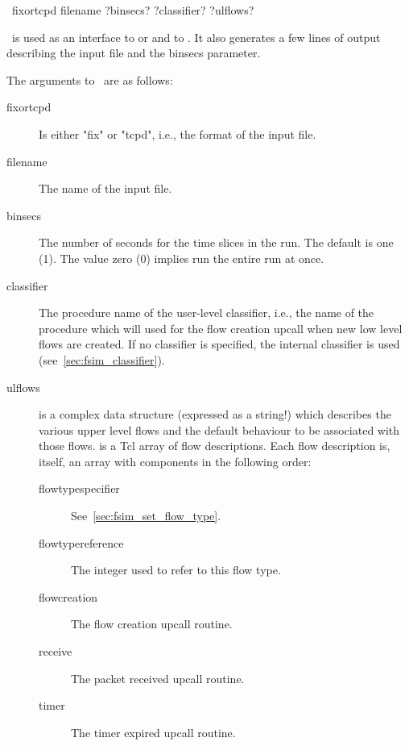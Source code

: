 \documentclass{article}
\begin{document}
\SYNOPSIS \cmdname\ fixortcpd filename ?binsecs? ?classifier? ?ulflows?

\cmdname\ is used as an interface to  or
 and to .  It also generates
a few lines of output describing the input file and the binsecs
parameter.

The arguments to \cmdname\ are as follows:
\begin{description}
\item[fixortcpd] Is either "fix" or "tcpd", i.e., the format of the
input file.
\item[filename] The name of the input file.
\item[binsecs] The number of seconds for the time slices in the run.
The default is one (1).  The value zero (0) implies run the entire run
at once.
\item[classifier] The procedure name of the user-level classifier,
i.e., the name of the procedure which will used for the flow creation
upcall when new low level flows are created.  If no classifier is
specified, the internal classifier  is used
(see~\ref{sec:fsim_classifier}).
\item[ulflows]   is a complex data structure (expressed
as a string!) which describes the various upper level flows and the
default behaviour to be associated with those flows.  
is a Tcl array of flow descriptions.  Each flow description is, itself,
an array with components in the following order:
\begin{description}
\item[flowtypespecifier] See~\ref{sec:fsim_set_flow_type}.
\item[flowtypereference] The integer used to refer to this flow type.
\item[flowcreation] The flow creation upcall routine.
\item[receive] The packet received upcall routine.
\item[timer] The timer expired upcall routine.
\end{description}
\end{description}

\SEEALSO


\manend

\label{sec:fsim_setft}
\end{document}
